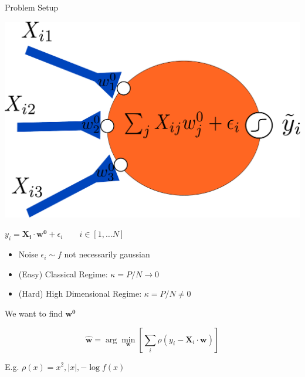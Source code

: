 \documentclass[pdf]{beamer}
\newcommand{\ra}{\rightarrow}
\begin{document}
\begin{frame}{Problem Setup}

\begin{flushright}
\includegraphics[width = .2\linewidth]{neuronInference.pdf}
\end{flushright}


$y_i = \mathbf{X_i}\cdot \mathbf{w^0} + \epsilon_i \quad \quad i\in [1,\dots N]$

\begin{itemize}


\item Noise $\epsilon_i \sim f$ not necessarily gaussian

\item (Easy) Classical Regime: $\kappa = P/N\ra 0$
\item (Hard) High Dimensional Regime: $\kappa = P/N \ne 0$

\end{itemize}
\vspace{.2in}



\vspace{.2in}

We want to find $\mathbf{w^0}$


\begin{equation*}
\mathbf{\hat{w}}=\arg \min_{\mathbf{w}}{\left[ \sum_{i} {\rho\left( y_i - \mathbf{X}_{i} \cdot \mathbf{w}\right)}\right]}
\end{equation*}

E.g. $\rho(x) = x^2,|x|,-\log f(x)$

\end{frame}
\end{document}

